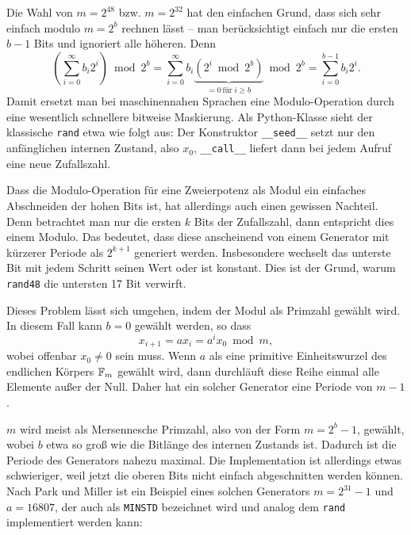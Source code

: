 Die Wahl von $m=2^{48}$ bzw. $m=2^{32}$ hat den einfachen Grund, dass
sich sehr einfach modulo $m=2^b$ rechnen lässt -- man berücksichtigt
einfach nur die ersten $b-1$ Bits und ignoriert alle höheren. Denn
\begin{equation}
  \label{eq:lcgmod}
  \left(\sum_{i=0}^\infty b_i 2^i\right) \bmod 2^b =
  \sum_{i=0}^\infty b_i \underbrace{\left(  2^i \bmod 2^b \right)}_{=
      0\,\text{für}\; i\ge b} \bmod 2^b = \sum_{i=0}^{b-1} b_i 2^i.
\end{equation}
Damit ersetzt man bei maschinennahen Sprachen eine Modulo-Operation
durch eine wesentlich schnellere bitweise Maskierung. Als
Python-Klasse sieht der klassische \texttt{rand} etwa wie folgt aus:
%
Der Konstruktor \lstinline!__seed__! setzt nur den anfänglichen
internen Zustand, also $x_0$, \lstinline!__call__! liefert dann bei
jedem Aufruf eine neue Zufallszahl.

Dass die Modulo-Operation für eine Zweierpotenz als Modul ein
einfaches Abschneiden der hohen Bits ist, hat allerdings auch einen
gewissen Nachteil. Denn betrachtet man nur die ersten $k$ Bits der
Zufallszahl, dann entspricht dies einem Modulo. Das bedeutet, dass
diese anscheinend von einem Generator mit kürzerer Periode als
$2^{k+1}$ generiert werden.  Insbesondere wechselt das unterste Bit
mit jedem Schritt seinen Wert oder ist konstant.  Dies ist der Grund,
warum \texttt{rand48} die untersten 17 Bit verwirft.

Dieses Problem lässt sich umgehen, indem der Modul als Primzahl
gewählt wird. In diesem Fall kann $b=0$ gewählt werden, so dass
\begin{equation}
  x_{i+1} = a x_i = a^i x_0 \bmod m,
\end{equation}
wobei offenbar $x_0\neq 0$ sein muss. Wenn $a$ als eine primitive
Einheitswurzel des endlichen Körpers $\mathbb{F}_m$ gewählt wird, dann
durchläuft diese Reihe einmal alle Elemente außer der Null. Daher hat
ein solcher Generator eine Periode von $m-1$.

$m$ wird meist als Mersennesche Primzahl, also von der Form $m=2^b -
1$, gewählt, wobei $b$ etwa so groß wie die Bitlänge des internen
Zustands ist. Dadurch ist die Periode des Generators nahezu maximal.
Die Implementation ist allerdings etwas schwieriger, weil jetzt die
oberen Bits nicht einfach abgeschnitten werden können. Nach Park und
Miller ist ein Beispiel eines solchen Generators $m=2^{31}-1$ und
$a=16807$, der auch als \texttt{MINSTD} bezeichnet wird und analog dem
\texttt{rand} implementiert werden kann:


